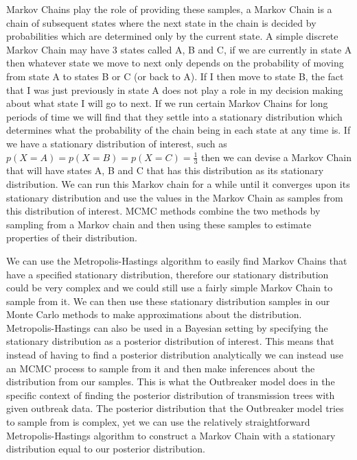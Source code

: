 \documentclass[11pt,a4paper]{report}
\begin{document}
Markov Chains play the role of providing these samples, a Markov Chain is a chain of subsequent states where the next state in the chain is decided by probabilities which are determined only by the current state. A simple discrete Markov Chain may have 3 states called A, B and C, if we are currently in state A then whatever state we move to next only depends on the probability of moving from state A to states B or C (or back to A). If I then move to state B, the fact that I was just previously in state A does not play a role in my decision making about what state I will go to next. If we run certain Markov Chains for long periods of time we will find that they settle into a stationary distribution which determines what the probability of the chain being in each state at any time is. If we have a stationary distribution of interest, such as $p(X=A)=p(X=B)=p(X=C)=\frac{1}{3}$ then we can devise a Markov Chain that will have states A, B and C that has this distribution as its stationary distribution. We can run this Markov chain for a while until it converges upon its stationary distribution and use the values in the Markov Chain as samples from this distribution of interest. MCMC methods combine the two methods by sampling from a Markov chain and then using these samples to estimate properties of their distribution.

We can use the Metropolis-Hastings algorithm to easily find Markov Chains that have a specified stationary distribution, therefore our stationary distribution could be very complex and we could still use a fairly simple Markov Chain to sample from it. We can then use these stationary distribution samples in our Monte Carlo methods to make approximations about the distribution. Metropolis-Hastings can also be used in a Bayesian setting by specifying the stationary distribution as a posterior distribution of interest. This means that instead of having to find a posterior distribution analytically we can instead use an MCMC process to sample from it and then make inferences about the distribution from our samples. This is what the Outbreaker model does in the specific context of finding the posterior distribution of transmission trees with given outbreak data. The posterior distribution that the Outbreaker model tries to sample from is complex, yet we can use the relatively straightforward Metropolis-Hastings algorithm  to construct a Markov Chain with a stationary distribution equal to our posterior distribution.
\end{document}
